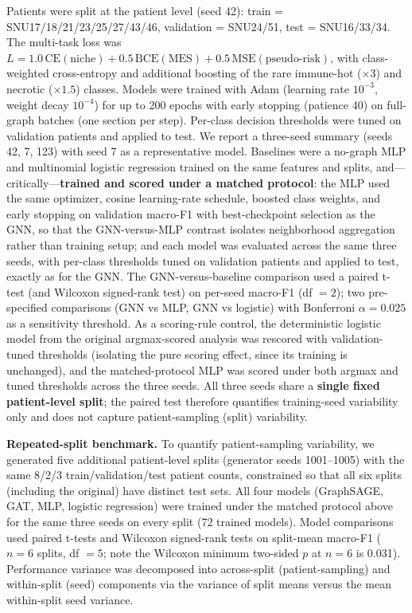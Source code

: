 \documentclass[11pt,letterpaper]{article}
\begin{document}
Patients were split at the patient level (seed 42): train = SNU17/18/21/23/25/27/43/46, validation = SNU24/51, test = SNU16/33/34. The multi-task loss was $L = 1.0\,\mathrm{CE}(\text{niche}) + 0.5\,\mathrm{BCE}(\text{MES}) + 0.5\,\mathrm{MSE}(\text{pseudo-risk})$, with class-weighted cross-entropy and additional boosting of the rare immune-hot ($\times3$) and necrotic ($\times1.5$) classes. Models were trained with Adam (learning rate $10^{-3}$, weight decay $10^{-4}$) for up to 200 epochs with early stopping (patience 40) on full-graph batches (one section per step). Per-class decision thresholds were tuned on validation patients and applied to test. We report a three-seed summary (seeds 42, 7, 123) with seed 7 as a representative model. Baselines were a no-graph MLP and multinomial logistic regression trained on the same features and splits, and---critically---\textbf{trained and scored under a matched protocol}: the MLP used the same optimizer, cosine learning-rate schedule, boosted class weights, and early stopping on validation macro-F1 with best-checkpoint selection as the GNN, so that the GNN-versus-MLP contrast isolates neighborhood aggregation rather than training setup; and each model was evaluated across the same three seeds, with per-class thresholds tuned on validation patients and applied to test, exactly as for the GNN. The GNN-versus-baseline comparison used a paired t-test (and Wilcoxon signed-rank test) on per-seed macro-F1 (df $=2$); two pre-specified comparisons (GNN vs MLP, GNN vs logistic) with Bonferroni $\alpha=0.025$ as a sensitivity threshold. As a scoring-rule control, the deterministic logistic model from the original argmax-scored analysis was rescored with validation-tuned thresholds (isolating the pure scoring effect, since its training is unchanged), and the matched-protocol MLP was scored under both argmax and tuned thresholds across the three seeds. All three seeds share a \textbf{single fixed patient-level split}; the paired test therefore quantifies training-seed variability only and does not capture patient-sampling (split) variability.

\textbf{Repeated-split benchmark.} To quantify patient-sampling variability, we generated five additional patient-level splits (generator seeds 1001--1005) with the same 8/2/3 train/validation/test patient counts, constrained so that all six splits (including the original) have distinct test sets. All four models (GraphSAGE, GAT, MLP, logistic regression) were trained under the matched protocol above for the same three seeds on every split (72 trained models). Model comparisons used paired t-tests and Wilcoxon signed-rank tests on split-mean macro-F1 ($n=6$ splits, df $=5$; note the Wilcoxon minimum two-sided $p$ at $n=6$ is 0.031). Performance variance was decomposed into across-split (patient-sampling) and within-split (seed) components via the variance of split means versus the mean within-split seed variance.
\end{document}
